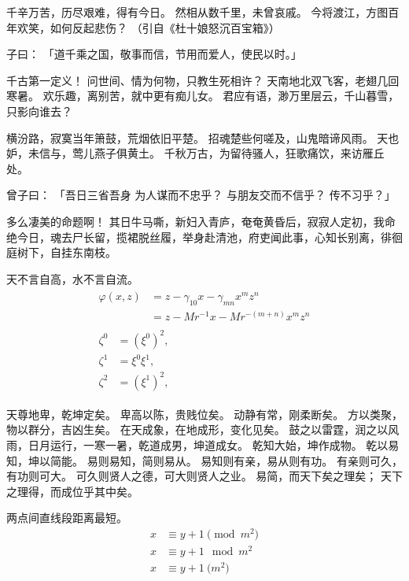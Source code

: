 千辛万苦，历尽艰难，得有今日。
然相从数千里，未曾哀戚。
今将渡江，方图百年欢笑，如何反起悲伤？
（引自《杜十娘怒沉百宝箱》）

\begin{definition}
  子曰：
  「道千乘之国，敬事而信，节用而爱人，使民以时。」
\end{definition}

千古第一定义！
问世间、情为何物，只教生死相许？
天南地北双飞客，老翅几回寒暑。
欢乐趣，离别苦，就中更有痴儿女。
君应有语，渺万里层云，千山暮雪，只影向谁去？

横汾路，寂寞当年箫鼓，荒烟依旧平楚。
招魂楚些何嗟及，山鬼暗谛风雨。
天也妒，未信与，莺儿燕子俱黄土。
千秋万古，为留待骚人，狂歌痛饮，来访雁丘处。

\begin{proposition}
  曾子曰：
  「吾日三省吾身 \pozhehao 为人谋而不忠乎？
  与朋友交而不信乎？
  传不习乎？」
\end{proposition}

多么凄美的命题啊！
其日牛马嘶，新妇入青庐，奄奄黄昏后，寂寂人定初，我命绝今日，魂去尸长留，揽裙脱丝履，举身赴清池，府吏闻此事，心知长别离，徘徊庭树下，自挂东南枝。

\begin{remark}
  天不言自高，水不言自流。
  \begin{gather*}
    \begin{split}
      \varphi(x,z)
      &=z-\gamma_{10}x-\gamma_{mn}x^mz^n\\
      &=z-Mr^{-1}x-Mr^{-(m+n)}x^mz^n
    \end{split}\\[6pt]
    \begin{align} \zeta^0 & =(\xi^0)^2,  \\
      \zeta^1 & =\xi^0\xi^1, \\
      \zeta^2 & =(\xi^1)^2,
    \end{align}
  \end{gather*}
\end{remark}

天尊地卑，乾坤定矣。
卑高以陈，贵贱位矣。
动静有常，刚柔断矣。
方以类聚，物以群分，吉凶生矣。
在天成象，在地成形，变化见矣。
鼓之以雷霆，润之以风雨，日月运行，一寒一暑，乾道成男，坤道成女。
乾知大始，坤作成物。
乾以易知，坤以简能。
易则易知，简则易从。
易知则有亲，易从则有功。
有亲则可久，有功则可大。
可久则贤人之德，可大则贤人之业。
易简，而天下矣之理矣；
天下之理得，而成位乎其中矣。

\begin{axiom}
  两点间直线段距离最短。
  \begin{align}
    x & \equiv y+1\pmod{m^2} \\
    x & \equiv y+1\mod{m^2}  \\
    x & \equiv y+1\pod{m^2}
  \end{align}
\end{axiom}

